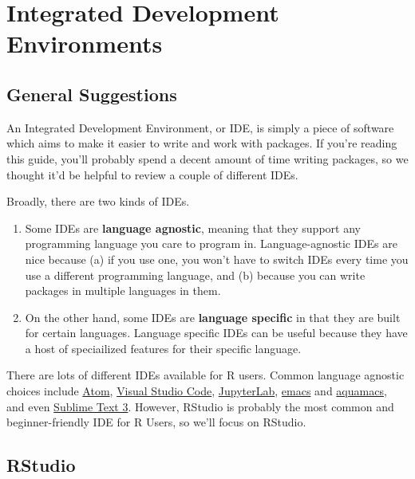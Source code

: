 \documentclass[]{book}
\providecommand{\tightlist}{%
  \setlength{\itemsep}{0pt}\setlength{\parskip}{0pt}}
\begin{document}
\chapter{Integrated Development
Environments}\label{integrated-development-environments}

\section{General Suggestions}\label{general-suggestions}

An Integrated Development Environment, or IDE, is simply a piece of
software which aims to make it easier to write and work with packages.
If you're reading this guide, you'll probably spend a decent amount of
time writing packages, so we thought it'd be helpful to review a couple
of different IDEs.

Broadly, there are two kinds of IDEs.

\begin{enumerate}
\def\labelenumi{\arabic{enumi}.}
\tightlist
\item
  Some IDEs are \textbf{language agnostic}, meaning that they support
  any programming language you care to program in. Language-agnostic
  IDEs are nice because (a) if you use one, you won't have to switch
  IDEs every time you use a different programming language, and (b)
  because you can write packages in multiple languages in them.
\item
  On the other hand, some IDEs are \textbf{language specific} in that
  they are built for certain languages. Language specific IDEs can be
  useful because they have a host of speciailized features for their
  specific language.
\end{enumerate}

There are lots of different IDEs available for R users. Common language
agnostic choices include \href{https://atom.io/}{Atom},
\href{https://code.visualstudio.com/}{Visual Studio Code},
\href{https://github.com/jupyterlab}{JupyterLab},
\href{https://www.gnu.org/software/emacs/}{emacs} and
\href{http://aquamacs.org/}{aquamacs}, and even
\href{https://www.sublimetext.com/}{Sublime Text 3}. However, RStudio is
probably the most common and beginner-friendly IDE for R Users, so we'll
focus on RStudio.

\section{RStudio}\label{rstudio}
\end{document}
